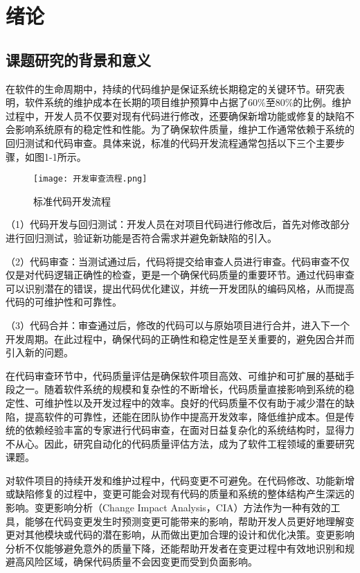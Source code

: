 
\chapter{绪论}

\section{课题研究的背景和意义}

在软件的生命周期中，持续的代码维护是保证系统长期稳定的关键环节。研究表明，软件系统的维护成本在长期的项目维护预算中占据了60\%至80\%的比例\cite{2012Maintenance}。维护过程中，开发人员不仅要对现有代码进行修改，还要确保新增功能或修复的缺陷不会影响系统原有的稳定性和性能。为了确保软件质量，维护工作通常依赖于系统的回归测试和代码审查。具体来说，标准的代码开发流程通常包括以下三个主要步骤，如图1-1所示。

\begin{figure}[h]
\centering
\texttt{[image: 开发审查流程.png]}
\caption{标准代码开发流程}
\end{figure}

（1）代码开发与回归测试：开发人员在对项目代码进行修改后，首先对修改部分进行回归测试，验证新功能是否符合需求并避免新缺陷的引入。

（2）代码审查：当测试通过后，代码将提交给审查人员进行审查。代码审查不仅仅是对代码逻辑正确性的检查，更是一个确保代码质量的重要环节。通过代码审查可以识别潜在的错误，提出代码优化建议，并统一开发团队的编码风格，从而提高代码的可维护性和可靠性。

（3）代码合并：审查通过后，修改的代码可以与原始项目进行合并，进入下一个开发周期。在此过程中，确保代码的正确性和稳定性是至关重要的，避免因合并而引入新的问题。

在代码审查环节中，代码质量评估是确保软件项目高效、可维护和可扩展的基础手段之一。随着软件系统的规模和复杂性的不断增长，代码质量直接影响到系统的稳定性、可维护性以及开发过程中的效率。良好的代码质量不仅有助于减少潜在的缺陷，提高软件的可靠性，还能在团队协作中提高开发效率，降低维护成本。但是传统的依赖经验丰富的专家进行代码审查，在面对日益复杂化的系统结构时，显得力不从心\cite{2016Microservices}。因此，研究自动化的代码质量评估方法，成为了软件工程领域的重要研究课题。

对软件项目的持续开发和维护过程中，代码变更不可避免。在代码修改、功能新增或缺陷修复的过程中，变更可能会对现有代码的质量和系统的整体结构产生深远的影响。变更影响分析（Change Impact Analysis，CIA）方法作为一种有效的工具，能够在代码变更发生时预测变更可能带来的影响，帮助开发人员更好地理解变更对其他模块或代码的潜在影响，从而做出更加合理的设计和优化决策。变更影响分析不仅能够避免意外的质量下降，还能帮助开发者在变更过程中有效地识别和规避高风险区域，确保代码质量不会因变更而受到负面影响。

